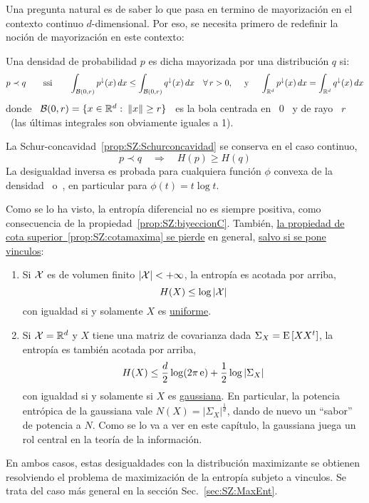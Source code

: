 Una pregunta natural es de saber lo  que pasa en termino de mayorizaci\'on en el
contexto continuo $d$-dimensional. Por eso,  se necesita primero de redefinir la
noci\'on de mayorizaci\'on en este contexto:
%
\begin{definicion}\label{def:SZ:MayorizacionC}
  Una densidad  de probabilidad $p$  es dicha mayorizada por  una distribuci\'on
  $q$ si:
  \[
  p \prec  q \qquad \mbox{ssi}  \qquad \int_{\mathcal{B}(0,r)} p^\downarrow(x) \,  dx \le
  \int_{\mathcal{B}(0,r)} q^\downarrow(x) \, dx \quad \forall  \, r > 0, \quad \mbox{ y }
  \quad \int_{\mathbb{R}^d} p^\downarrow(x) \, dx = \int_{\mathbb{R}^d} q^\downarrow(x) \,
  dx
  \]
  donde \ $\mathcal{B}(0,r) = \{ x \in \mathbb{R}^d:  \: \|x\| \ge r \}$ \ es la bola centrada
  en \ $0$ \ y de rayo  \ $r$ \ (las \'ultimas integrales son obviamente iguales
  a 1).
\end{definicion}
%
\noindent  La Schur-concavidad~\ref{prop:SZ:Schurconcavidad}  se conserva  en el
caso  continuo, \ie
%
\[
p \prec  q  \quad \Rightarrow  \quad H(p)  \ge H(q)
\]
%
La desigualdad inversa es probada  para cualquiera funci\'on $\phi$ convexa de la
densidad~\cite{Cho74} o~\cite[Prop.~7.3]{WanMad04},  en particular para $\phi(t)
= t \log t$.

Como se  lo ha  visto, la  entrop\'ia diferencial no  es siempre  positiva, como
consecuencia de la propiedad~\ref{prop:SZ:biyeccionC}.  Tambi\'en, \underline{la
  propiedad  de cota  superior~\ref{prop:SZ:cotamaxima} se  pierde}  en general,
\underline{salvo si se pone vinculos}:
%
\begin{propiedadesC}\setcounter{enumi}{\value{PropCotamaxima}}
\item
  \begin{enumerate}
  \item\label{prop:SZ:cotamaximauniforme} Si $\mathcal{X}$ es de volumen finito $|\mathcal{X}| < +
    \infty$, la entrop\'ia es acotada por arriba,
    \[
    H(X) \le \log |\mathcal{X}|
    \]
    con igualdad si y solamente $X$ es \underline{uniforme}.
  \item\label{prop:SZ:cotamaximagaussiana}  Si  $\mathcal{X} =\mathbb{R}^d$  y  $X$ tiene  una
    matriz  de  covarianza  dada  $\Sigma_X  = \operatorname{E}\left[  X  X^t  \right]$,  la
    entrop\'ia es tambi\'en acotada por arriba,
    \[
    H(X) \le \frac{d}{2} \log(2 \pi \operatorname{e}) + \frac12 \log |\Sigma_X|
    \]
    con igualdad si y solamente si $X$ es \underline{gaussiana}.  En particular,
    la  potencia  entr\'opica de  la  gaussiana  vale  $N(X) =  \left|  \Sigma_X
    \right|^{\frac1d}$, dando de nuevo un  ``sabor'' de potencia a $N$.  Como se
    lo va  a ver en  este cap\'itulo,  la gaussiana juega  un rol central  en la
    teor\'ia de la informaci\'on.
  \end{enumerate}
  En  ambos casos,  estas  desigualdades con  la  distribuci\'on maximizante  se
  obtienen resolviendo el problema de  maximizaci\'on de la entrop\'ia subjeto a
  vinculos.    Se    trata   del   caso   m\'as   general    en   la   secci\'on
  Sec.~\ref{sec:SZ:MaxEnt}.
\end{propiedadesC}

